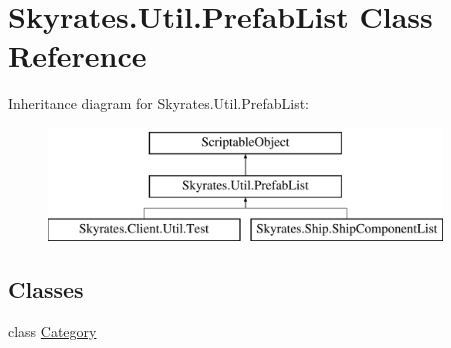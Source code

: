\hypertarget{class_skyrates_1_1_util_1_1_prefab_list}{\section{Skyrates.\-Util.\-Prefab\-List Class Reference}
\label{class_skyrates_1_1_util_1_1_prefab_list}
}


 


Inheritance diagram for Skyrates.\-Util.\-Prefab\-List\-:\begin{figure}[H]
\begin{center}
\leavevmode
\includegraphics[height=3.000000cm]{class_skyrates_1_1_util_1_1_prefab_list}
\end{center}
\end{figure}
\subsection*{Classes}
\begin{DoxyCompactItemize}
\item 
class \hyperlink{class_skyrates_1_1_util_1_1_prefab_list_1_1_category}{Category}
\end{DoxyCompactItemize}
